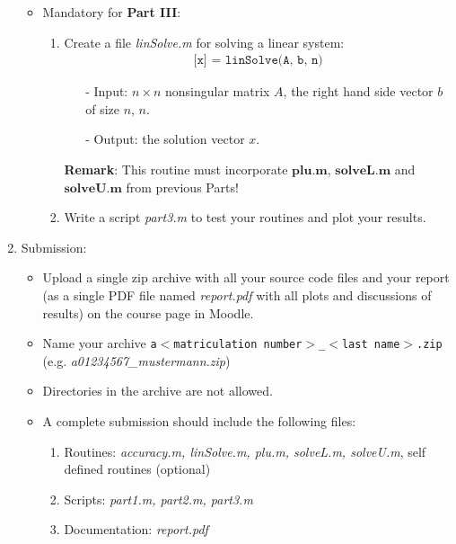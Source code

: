 \documentclass{scrartcl}
\begin{document}
\begin{enumerate}
\begin{itemize}
		\item Mandatory for \textbf{Part III}:
		 \begin{enumerate}
		 	\item Create a file \textit{linSolve.m} for solving a linear system:
		 	\begin{align*}
				\texttt{[x] = linSolve(A, b, n)}
			\end{align*}
			\begin{itemize}
				\item[-] Input: $n \times n$ nonsingular matrix $A$, the right hand side vector $b$ of size $n$, $n$.
            	\item[-] Output: the solution vector $x$.        	
        	\end{itemize}
\textbf{Remark}: This routine must incorporate $\textbf{plu.m}$, $\textbf{solveL.m}$ and $\textbf{solveU.m}$ from previous Parts!\\

			\item Write a script \textit{part3.m} to test your routines and plot your results.\\	
		\end{enumerate}
	\end{itemize}

	\item Submission:	
	\begin{itemize}		
		\item  Upload a single zip archive with all your source code files and your report (as a single
			PDF file named \textit{report.pdf} with all plots and discussions of results) on the course page in Moodle.
		\item Name your archive \texttt{a$<$matriculation number$>$\_$<$last name$>$.zip}\\
		(e.g. \textit{a01234567\_mustermann.zip})
		\item Directories in the archive are not allowed.
		\item A complete submission should include the following files:
		\begin{enumerate}
		\item Routines: \textit{accuracy.m, linSolve.m, plu.m, solveL.m, solveU.m}, self defined routines (optional)
		\item Scripts: \textit{part1.m, part2.m, part3.m}
		\item Documentation: \textit{report.pdf}
		\end{enumerate}
		
		\end{itemize}
	\end{enumerate}
\end{document}
